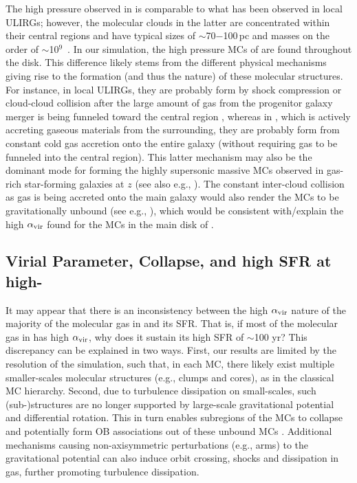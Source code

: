 \IfFileExists{emulateapjlegacy.cls}{\documentclass[iop]{emulateapjlegacy}}{\documentclass[iop]{emulateapj}}
\begin{document}
The high pressure observed in \flower is comparable to what has been observed in local ULIRGs; however, the
molecular clouds in the latter are concentrated within their 
central regions and have typical sizes of $\sim$70$-$100\,pc and masses on the order of $\sim$10$^9$\,\Msun
\citep{Downes98a, Sakamoto08a}. In our simulation, the high pressure MCs of \flower are
found throughout the disk. This difference likely stems from the different physical mechanisms giving rise
to the formation (and thus the nature) of these molecular structures.
For instance, in local ULIRGs, they are probably form by shock compression or cloud-cloud
collision after the large amount of gas from the progenitor galaxy merger
is being funneled toward the central region \citep{Tan00a, Wu18a},  %
whereas in \flower, which is actively accreting gaseous materials
from the surrounding, they are probably form from constant cold gas accretion onto the entire galaxy (without
requiring gas to be funneled into the central region).
This latter mechanism may also be the dominant mode for forming the highly supersonic massive MCs observed
in gas-rich star-forming galaxies at $z$ (see also e.g., \citealt{Swinbank11a}).
The constant inter-cloud collision as gas is being accreted onto the main galaxy would also render
the MCs to be gravitationally unbound (see e.g., \citealt{Dobbs11a}), which would be consistent with/explain the
high $\alpha_{\rm vir}$ found for the MCs in the main disk of \flower.


\subsection{Virial Parameter, Collapse, and high SFR at high-\z} \label{sec:diss2}

It may appear that there is an inconsistency between the high $\alpha_{\rm vir}$
nature of the majority of the molecular gas in \flower and its SFR.
That is, if most of the molecular gas in \flower has high $\alpha_{\rm vir}$, why does it sustain its high SFR of $\sim$100\,\Msun\,yr\pmOne?
This discrepancy can be explained in two ways.
First, our results are limited by the resolution of the simulation, such that, in each MC, there
likely exist multiple smaller-scales molecular structures (e.g., clumps and cores),
as in the classical MC hierarchy.
Second, due to
turbulence dissipation on small-scales, such (sub-)structures are no longer supported by
large-scale gravitational potential and differential rotation.
This in turn enables subregions of the MCs to collapse and potentially form OB associations out of these unbound
MCs \citep{Clark04a, Clark05a}.
Additional mechanisms causing non-axisymmetric perturbations (e.g., arms) to the gravitational potential
can also induce orbit crossing, shocks and dissipation in gas, further promoting turbulence dissipation.
\end{document}
